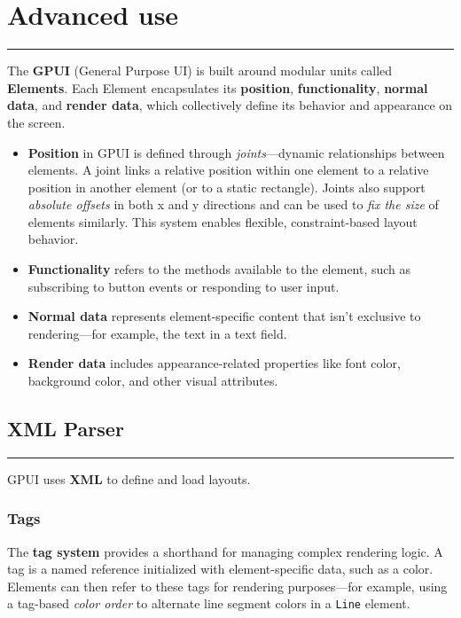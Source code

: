 \documentclass[a4paper,11pt]{article}
\begin{document}
\section*{Advanced use}
\vspace{-1.2em}
\rule{\linewidth}{0.4pt}
The \textbf{GPUI} (General Purpose UI) is built around modular units called \textbf{Elements}.  
Each Element encapsulates its \textbf{position}, \textbf{functionality}, \textbf{normal data}, and \textbf{render data}, which collectively define its behavior and appearance on the screen.

\begin{itemize}
    \item \textbf{Position} in GPUI is defined through \textit{joints}—dynamic relationships between elements. A joint links a relative position within one element to a relative position in another element (or to a static rectangle). Joints also support \textit{absolute offsets} in both x and y directions and can be used to \textit{fix the size} of elements similarly. This system enables flexible, constraint-based layout behavior.

    \item \textbf{Functionality} refers to the methods available to the element, such as subscribing to button events or responding to user input.

    \item \textbf{Normal data} represents element-specific content that isn’t exclusive to rendering—for example, the text in a text field.

    \item \textbf{Render data} includes appearance-related properties like font color, background color, and other visual attributes.
\end{itemize}

\subsection*{XML Parser}
\vspace{-1.2em}
\rule{\linewidth}{0.4pt}
GPUI uses \textbf{XML} to define and load layouts.

\hypertarget{tag}{}
\subsubsection*{Tags}

The \textbf{tag system} provides a shorthand for managing complex rendering logic. A tag is a named reference initialized with element-specific data, such as a color. Elements can then refer to these tags for rendering purposes—for example, using a tag-based \textit{color order} to alternate line segment colors in a \texttt{Line} element.
\end{document}
